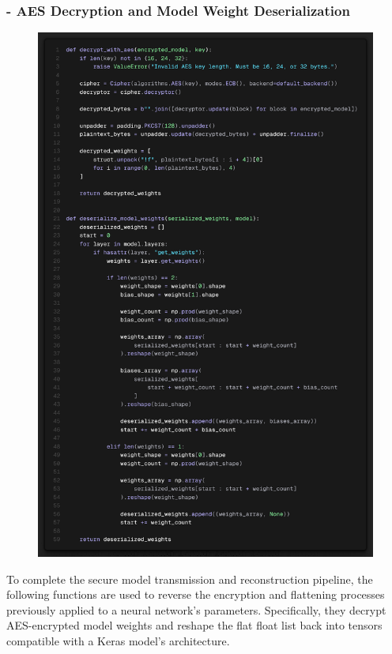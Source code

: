 \documentclass[10pt]{article}
\begin{document}
\subsubsection*{- AES Decryption and Model Weight Deserialization}
\begin{figure}[H]
	\centering
	\includegraphics[height = 0.5\textheight]{img/QFL_code/4.png}
\end{figure}
To complete the secure model transmission and reconstruction pipeline, the following functions are used to reverse the encryption and flattening processes previously applied to a neural network's parameters. Specifically, they decrypt AES-encrypted model weights and reshape the flat float list back into tensors compatible with a Keras model's architecture.
\end{document}
